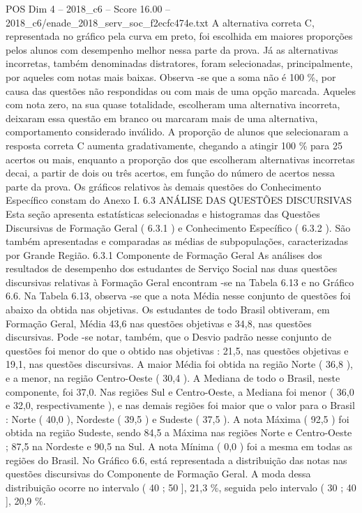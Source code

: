 \begin{textsample}{POS Dim 4 – 2018\_c6 – Score 16.00 – 2018\_c6/enade\_2018\_serv\_soc\_f2ecfc474e.txt}
A alternativa correta C, representada no gráfico pela curva em preto, foi escolhida em maiores proporções pelos alunos com desempenho melhor nessa parte da prova.
Já as alternativas incorretas, também denominadas distratores, foram selecionadas, principalmente, por aqueles com notas mais baixas.
Observa -se que a soma não é 100 \%, por causa das questões não respondidas ou com mais de uma opção marcada.
Aqueles com nota zero, na sua quase totalidade, escolheram uma alternativa incorreta, deixaram essa questão em branco ou marcaram mais de uma alternativa, comportamento considerado inválido.
A proporção de alunos que selecionaram a resposta correta C aumenta gradativamente, chegando a atingir 100 \% para 25 acertos ou mais, enquanto a proporção dos que escolheram alternativas incorretas decai, a partir de dois ou três acertos, em função do número de acertos nessa parte da prova.
Os gráficos relativos às demais questões do Conhecimento Específico constam do Anexo I. 6.3 ANÁLISE DAS QUESTÕES DISCURSIVAS Esta seção apresenta estatísticas selecionadas e histogramas das Questões Discursivas de Formação Geral ( 6.3.1 ) e Conhecimento Específico ( 6.3.2 ).
São também apresentadas e comparadas as médias de subpopulações, caracterizadas por Grande Região. 6.3.1 Componente de Formação Geral As análises dos resultados de desempenho dos estudantes de Serviço Social nas duas questões discursivas relativas à Formação Geral encontram -se na Tabela 6.13 e no Gráfico 6.6.
Na Tabela 6.13, observa -se que a nota Média nesse conjunto de questões foi abaixo da obtida nas objetivas.
Os estudantes de todo Brasil obtiveram, em Formação Geral, Média 43,6 nas questões objetivas e 34,8, nas questões discursivas.
Pode -se notar, também, que o Desvio padrão nesse conjunto de questões foi menor do que o obtido nas objetivas : 21,5, nas questões objetivas e 19,1, nas questões discursivas.
A maior Média foi obtida na região Norte ( 36,8 ), e a menor, na região Centro-Oeste ( 30,4 ).
A Mediana de todo o Brasil, neste componente, foi 37,0.
Nas regiões Sul e Centro-Oeste, a Mediana foi menor ( 36,0 e 32,0, respectivamente ), e nas demais regiões foi maior que o valor para o Brasil : Norte ( 40,0 ), Nordeste ( 39,5 ) e Sudeste ( 37,5 ).
A nota Máxima ( 92,5 ) foi obtida na região Sudeste, sendo 84,5 a Máxima nas regiões Norte e Centro-Oeste ; 87,5 na Nordeste e 90,5 na Sul.
A nota Mínima ( 0,0 ) foi a mesma em todas as regiões do Brasil.
No Gráfico 6.6, está representada a distribuição das notas nas questões discursivas do Componente de Formação Geral.
A moda dessa distribuição ocorre no intervalo ( 40 ; 50 ], 21,3 \%, seguida pelo intervalo ( 30 ; 40 ], 20,9 \%.

\end{textsample}
